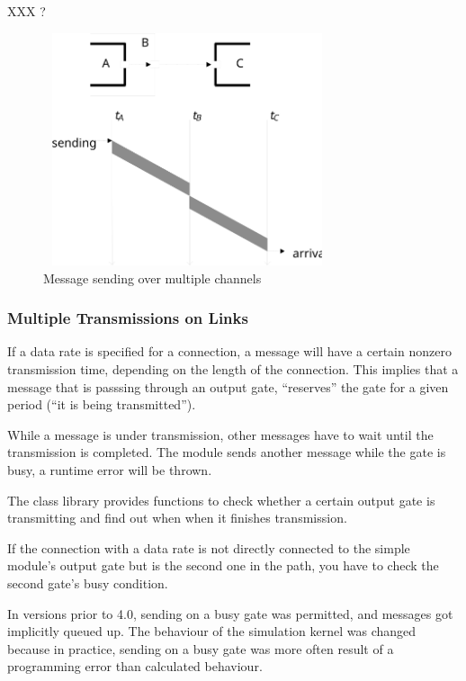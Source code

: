 XXX ?

\begin{figure}[htbp]
\begin{center}
\includegraphics[width=3.330in, height=2.692in]{figures/simple-messagesend}
\caption{Message sending over multiple channels}
\label{fig:ch-overview:msg-multiple-ch}
\end{center}
\end{figure}


\subsubsection{Multiple Transmissions on Links}

If a data rate is specified for a connection, a message
will have a certain nonzero transmission time, depending on the length of the connection. This implies that
a message that is passsing through an output gate, ``reserves'' the gate
for a given period (``it is being transmitted'').

While a message is under transmission, other messages have to wait
until the transmission is completed. The module sends another message while the
gate is busy, a runtime error will be thrown.

The {\opp} class library provides functions to check
whether a certain output gate is transmitting and find out when when
it finishes transmission.

If the connection with a data rate is not directly connected
to the simple module's output gate but is the second
one in the path, you have to check the second gate's busy
condition.

\begin{note}
   In {\opp} versions prior to 4.0, sending on a busy gate was permitted, and
   messages got implicitly queued up. The behaviour of the simulation kernel
   was changed because in practice, sending on a busy gate was more often result
   of a programming error than calculated behaviour.
\end{note}


